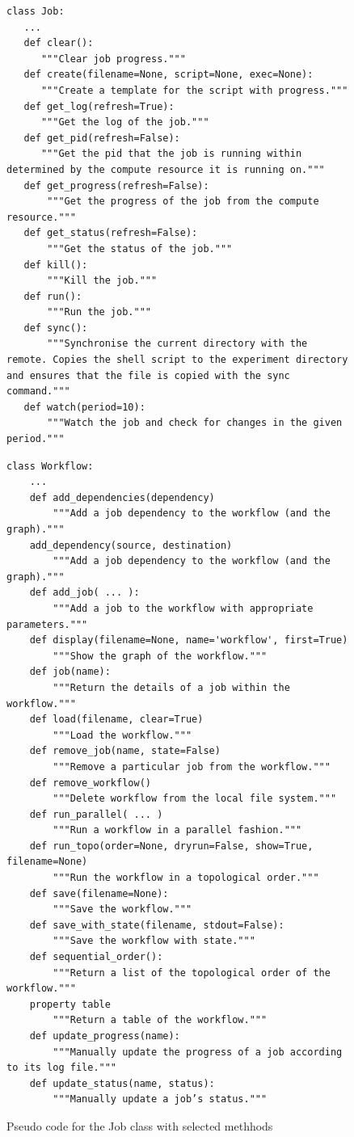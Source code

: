\begin{figure}[!h]
\begin{verbatim}
class Job:
   ...
   def clear():
      """Clear job progress."""
   def create(filename=None, script=None, exec=None):
      """Create a template for the script with progress."""
   def get_log(refresh=True):
      """Get the log of the job."""
   def get_pid(refresh=False):
      """Get the pid that the job is running within determined by the compute resource it is running on."""
   def get_progress(refresh=False):
       """Get the progress of the job from the compute resource."""
   def get_status(refresh=False):
       """Get the status of the job."""
   def kill():
       """Kill the job."""
   def run():
       """Run the job."""
   def sync():
       """Synchronise the current directory with the remote. Copies the shell script to the experiment directory and ensures that the file is copied with the sync command."""
   def watch(period=10):
       """Watch the job and check for changes in the given period."""
\end{verbatim}
\caption{Pseudo code for the Job class with selected methhods}
\label{fig:code-job}

\bigskip

\begin{verbatim}
class Workflow:
    ...
    def add_dependencies(dependency)
        """Add a job dependency to the workflow (and the graph)."""
    add_dependency(source, destination)
        """Add a job dependency to the workflow (and the graph)."""
    def add_job( ... ):
        """Add a job to the workflow with appropriate parameters."""
    def display(filename=None, name='workflow', first=True)
        """Show the graph of the workflow."""
    def job(name):
        """Return the details of a job within the workflow."""
    def load(filename, clear=True)
        """Load the workflow."""
    def remove_job(name, state=False)
        """Remove a particular job from the workflow."""
    def remove_workflow()
        """Delete workflow from the local file system."""
    def run_parallel( ... )
        """Run a workflow in a parallel fashion."""
    def run_topo(order=None, dryrun=False, show=True, filename=None)
        """Run the workflow in a topological order."""
    def save(filename=None):
        """Save the workflow."""
    def save_with_state(filename, stdout=False):
        """Save the workflow with state."""
    def sequential_order():
        """Return a list of the topological order of the workflow."""
    property table
        """Return a table of the workflow."""
    def update_progress(name):
        """Manually update the progress of a job according to its log file."""
    def update_status(name, status):
        """Manually update a job’s status."""
\end{verbatim}
\caption{Pseudo code for the Job class with selected methhods}
\label{fig:code-workflow}
\end{figure}


